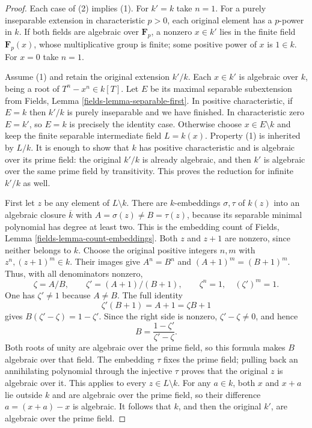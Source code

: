 \begin{proof}
Each case of (2) implies (1). For $k'=k$
take $n=1$. For a purely inseparable
extension in characteristic $p>0$, each
original element has a $p$-power in $k$.
If both fields are algebraic over
$\mathbf F_p$, a nonzero $x\in k'$
lies in the finite field $\mathbf F_p(x)$,
whose multiplicative group is finite;
some positive power of $x$ is $1\in k$.
For $x=0$ take $n=1$.

Assume (1) and retain the original extension
$k'/k$. Each $x\in k'$ is algebraic over
$k$, being a root of $T^n-x^n\in k[T]$.
Let $E$ be its maximal separable
subextension from Fields, Lemma
\ref{fields-lemma-separable-first}.
In positive characteristic, if $E=k$
then $k'/k$ is purely inseparable and
we have finished. In characteristic
zero $E=k'$, so $E=k$ is precisely the
identity case. Otherwise choose
$x\in E\setminus k$ and keep the finite
separable intermediate field $L=k(x)$.
Property (1) is inherited by $L/k$.
It is enough to show that $k$ has
positive characteristic and is algebraic
over its prime field: the original
$k'/k$ is already algebraic, and then
$k'$ is algebraic over the same prime
field by transitivity. This proves the
reduction for infinite $k'/k$ as well.

First let $z$ be any element of $L\setminus k$.
There are $k$-embeddings $\sigma,\tau$ of
$k(z)$ into an algebraic closure $\overline k$
with $A=\sigma(z)\neq B=\tau(z)$, because
its separable minimal polynomial has
degree at least two. This is the
embedding count of Fields, Lemma
\ref{fields-lemma-count-embeddings}.
Both $z$ and $z+1$ are nonzero, since
neither belongs to $k$. Choose the
original positive integers $n,m$ with
$z^n,(z+1)^m\in k$. Their images give
$A^n=B^n$ and $(A+1)^m=(B+1)^m$.
Thus, with all denominators nonzero,
$$
\zeta=A/B,\qquad \zeta'=(A+1)/(B+1),
\qquad \zeta^n=1,\quad(\zeta')^m=1.
$$
One has $\zeta'\neq1$ because $A\neq B$.
The full identity
$$
\zeta'(B+1)=A+1=\zeta B+1
$$
gives $B(\zeta'-\zeta)=1-\zeta'$.
Since the right side is nonzero,
$\zeta'-\zeta\neq0$, and hence
$$
B=\frac{1-\zeta'}{\zeta'-\zeta}.
$$
Both roots of unity are algebraic over
the prime field, so this formula makes
$B$ algebraic over that field. The
embedding $\tau$ fixes the prime field;
pulling back an annihilating polynomial
through the injective $\tau$ proves that
the original $z$ is algebraic over it.
This applies to every $z\in L\setminus k$.
For any $a\in k$, both $x$ and $x+a$
lie outside $k$ and are algebraic over
the prime field, so their difference
$a=(x+a)-x$ is algebraic. It follows
that $k$, and then the original $k'$,
are algebraic over the prime field.


\end{proof}
